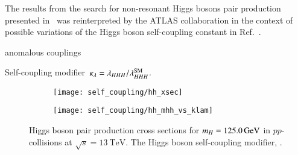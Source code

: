 The results from the search for non-resonant Higgs bosons pair
production presented in~ was reinterpreted by the
ATLAS collaboration in the context of possible variations of the Higgs
boson self-coupling constant \lambdahhh in
Ref.~\cite{ATLAS-CONF-2021-052}.

anomalous couplings

Self-coupling modifier~$\kappa_{\lambda} = \lambda_{HHH} / \lambda_{HHH}^{\text{SM}}$.



\begin{figure}[htbp]
  \begin{subfigure}{0.495\textwidth}
    \texttt{[image: self\_coupling/hh\_xsec]}
    \label{fig:hh_xsec_incl}
  \end{subfigure}\hfill%
  \begin{subfigure}{0.495\textwidth}
    \texttt{[image: self\_coupling/hh\_mhh\_vs\_klam]}
    \subcaption{}
  \end{subfigure}

  \caption{Higgs boson pair production cross sections for
    $m_{H} = \SI{125.0}{\ensuremath{\text{GeV}}}$ in $pp$-collisions at
    $\sqrt{s} = \SI{13}{\TeV}$. The Higgs boson self-coupling
    modifier, \klambda.
  }%
  \label{fig:hh_xsec_vs_klam}
\end{figure}














